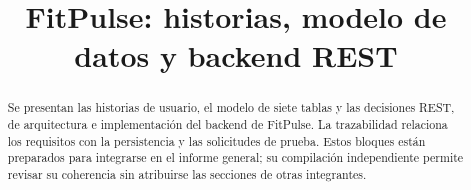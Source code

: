\documentclass[conference]{IEEEtran}
\begin{document}
\title{FitPulse: historias, modelo de datos y backend REST}
\author{}
\maketitle
\begin{abstract}
Se presentan las historias de usuario, el modelo de siete tablas y las decisiones REST, de arquitectura e implementación del backend de FitPulse. La trazabilidad relaciona los requisitos con la persistencia y las solicitudes de prueba. Estos bloques están preparados para integrarse en el informe general; su compilación independiente permite revisar su coherencia sin atribuirse las secciones de otras integrantes.
\end{abstract}





\balance


\end{document}
